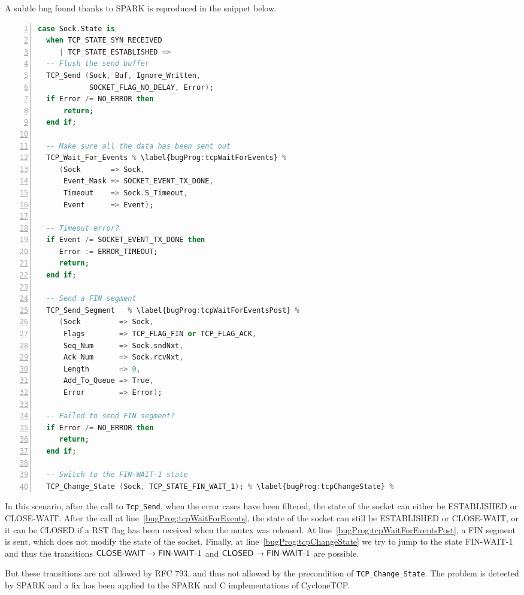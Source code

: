 \documentclass[conference]{IEEEtran}
\def\spark#1{\lstinline[language=Ada]{#1}}
\def\state#1{\textsf{\MakeUppercase{#1}}\xspace}
\def\sclosed{\state{closed}}
\def\sestab{\state{established}}
\def\sfwone{\state{fin-wait-1}}
\def\sclosew{\state{close-wait}}
\def\flag#1{\textsf{#1}\xspace}
\def\rst{\flag{RST}}
\def\fin{\flag{FIN}}
\begin{document}
A subtle bug found thanks to SPARK is
reproduced in the snippet below.

\begin{lstlisting}[language=Ada, basicstyle=\footnotesize\ttfamily,
                    numbers=left, numberstyle=\tiny, escapechar=\%]
case Sock.State is
  when TCP_STATE_SYN_RECEIVED
     | TCP_STATE_ESTABLISHED =>
  -- Flush the send buffer
  TCP_Send (Sock, Buf, Ignore_Written,
            SOCKET_FLAG_NO_DELAY, Error);
  if Error /= NO_ERROR then
      return;
  end if;

  -- Make sure all the data has been sent out
  TCP_Wait_For_Events % \label{bugProg:tcpWaitForEvents} %
     (Sock       => Sock,
      Event_Mask => SOCKET_EVENT_TX_DONE,
      Timeout    => Sock.S_Timeout,
      Event      => Event);

  -- Timeout error?
  if Event /= SOCKET_EVENT_TX_DONE then
     Error := ERROR_TIMEOUT;
     return;
  end if;

  -- Send a FIN segment
  TCP_Send_Segment   % \label{bugProg:tcpWaitForEventsPost} %
     (Sock         => Sock,
      Flags        => TCP_FLAG_FIN or TCP_FLAG_ACK,
      Seq_Num      => Sock.sndNxt,
      Ack_Num      => Sock.rcvNxt,
      Length       => 0,
      Add_To_Queue => True,
      Error        => Error);

  -- Failed to send FIN segment?
  if Error /= NO_ERROR then
     return;
  end if;

  -- Switch to the FIN-WAIT-1 state
  TCP_Change_State (Sock, TCP_STATE_FIN_WAIT_1); % \label{bugProg:tcpChangeState} %
\end{lstlisting}

In this scenario, after the call to \spark{Tcp_Send}, when the error cases have
been filtered, the state of the socket can either be \sestab or \sclosew. After the call
at line~\ref{bugProg:tcpWaitForEvents}, the state of the socket can
still be \sestab or \sclosew, or it can be \sclosed if a \rst flag has been received when the mutex
was released.
At line~\ref{bugProg:tcpWaitForEventsPost}, a \fin segment is sent, which does
not modify the state of the socket. Finally, at line~\ref{bugProg:tcpChangeState}
we try to jump to the state \sfwone and thus the transitions $\text{\sclosew}
\rightarrow \text{\sfwone}$ and $\text{\sclosed} \rightarrow \text{\sfwone}$ are
possible.

But these transitions are not allowed by RFC 793, and thus not allowed by the
precondition of \spark{TCP_Change_State}. The problem is detected by SPARK and a fix
has been applied to the SPARK and C implementations of CycloneTCP.
\end{document}
